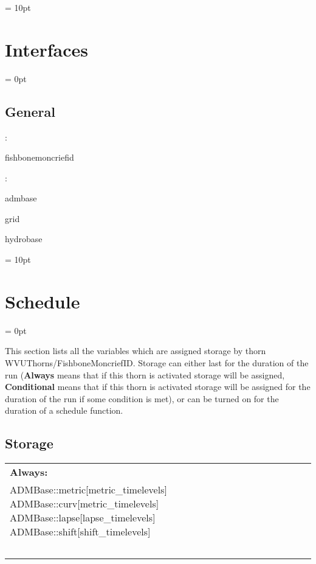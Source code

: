 \documentclass{article}
\begin{document}
\vspace{0.5cm}\parskip = 10pt 

\section{Interfaces} 


\parskip = 0pt

\vspace{3mm} \subsection*{General}

: 

fishbonemoncriefid
\vspace{2mm}

: 

admbase

grid

hydrobase
\vspace{2mm}

\vspace{5mm}\parskip = 10pt 

\section{Schedule} 


\parskip = 0pt


\noindent This section lists all the variables which are assigned storage by thorn WVUThorns/FishboneMoncriefID.  Storage can either last for the duration of the run ({\bf Always} means that if this thorn is activated storage will be assigned, {\bf Conditional} means that if this thorn is activated storage will be assigned for the duration of the run if some condition is met), or can be turned on for the duration of a schedule function.


\subsection*{Storage}

\hspace{5mm}

 \begin{tabular*}{160mm}{ll} 

{\bf Always:}&  ~ \\ 
 ADMBase::metric[metric\_timelevels] ADMBase::curv[metric\_timelevels] ADMBase::lapse[lapse\_timelevels] ADMBase::shift[shift\_timelevels] & ~\\ 
~ & ~\\ 
\end{tabular*} 
\end{document}
